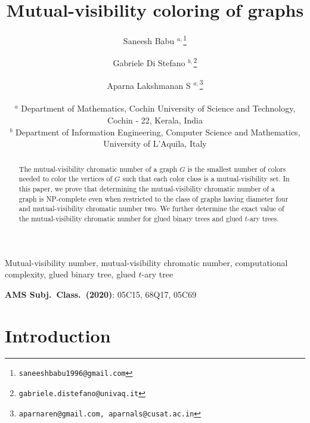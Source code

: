 \documentclass[12pt]{article}
\title{Mutual-visibility coloring of graphs}
\author{Saneesh Babu $^{a,}$\footnote{\tt saneeshbabu1996@gmail.com} 
   \and Gabriele Di Stefano $^{b,}$\footnote{\tt gabriele.distefano@univaq.it}
	\and Aparna Lakshmanan S $^{a,}$\footnote{\tt aparnaren@gmail.com, aparnals@cusat.ac.in} \\\\
	$^{a}$ \small Department of Mathematics, Cochin University of Science and Technology, \\ 
    \small Cochin - 22, Kerala, India \\
    $^b$ \small Department of Information Engineering, Computer Science and Mathematics, \\
    \small University of L'Aquila, Italy \\
}
\date{}
\begin{document}
\maketitle
\begin{abstract}
The mutual-visibility chromatic number of a graph $G$ is the smallest number of colors needed to color the vertices of $G$ such that each color class is a mutual-visibility set. In this paper, we prove that determining the mutual-visibility chromatic number of a graph is NP-complete even when restricted to the class of graphs having diameter four and mutual-visibility chromatic number two. We further determine the exact value of the mutual-visibility chromatic number for glued binary trees and glued $t$-ary trees.
\end{abstract}
 Mutual-visibility number, mutual-visibility chromatic number, computational complexity, glued binary tree, glued $t$-ary tree

\medskip\noindent
{\bf AMS Subj.\ Class.\ (2020)}: 05C15, 68Q17, 05C69
\section{Introduction}
\end{document}
